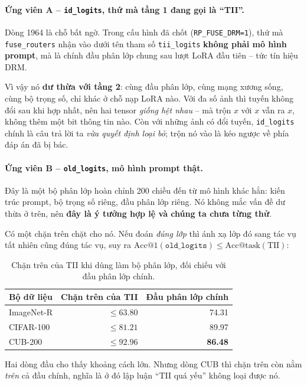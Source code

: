 \documentclass[11pt,a4paper]{article}
\begin{document}
\paragraph{Ứng viên A -- \texttt{id\_logits}, thứ mà tầng 1 đang gọi là ``TII''.}
Dòng 1964 là chỗ bất ngờ. Trong cấu hình đã chốt (\texttt{RP\_FUSE\_DRM=1}), thứ
mà \texttt{fuse\_routers} nhận vào dưới tên tham số \texttt{tii\_logits}
\textbf{không phải mô hình prompt}, mà là chính đầu phân lớp chung sau lượt LoRA
đầu tiên -- tức tín hiệu DRM.

Vì vậy nó \textbf{dư thừa với tầng 2}: cùng đầu phân lớp, cùng mạng xương sống,
cùng bộ trọng số, chỉ khác ở chỗ nạp LoRA nào. Với đa số ảnh thì tuyến không đổi
sau khi hợp nhất, nên hai tensor \emph{giống hệt nhau} -- mà trộn $x$ với $x$ vẫn
ra $x$, không thêm một bit thông tin nào. Còn với những ảnh có đổi tuyến,
\texttt{id\_logits} chính là câu trả lời ta \emph{vừa quyết định loại bỏ}; trộn
nó vào là kéo ngược về phía đáp án đã bị bác.

\paragraph{Ứng viên B -- \texttt{old\_logits}, mô hình prompt thật.}
Đây là một bộ phân lớp hoàn chỉnh 200 chiều đến từ mô hình khác hẳn: kiến trúc
prompt, bộ trọng số riêng, đầu phân lớp riêng. Nó không mắc vấn đề dư thừa ở
trên, nên \textbf{đây là ý tưởng hợp lệ và chúng ta chưa từng thử}.

Có một chặn trên chặt cho nó. Nếu đoán \emph{đúng lớp} thì ánh xạ lớp đó sang tác
vụ tất nhiên cũng đúng tác vụ, suy ra
$\mathrm{Acc@1}(\texttt{old\_logits}) \le \mathrm{Acc@task}(\text{TII})$:

\begin{table}[htbp]
\centering
\caption{Chặn trên của TII khi dùng làm bộ phân lớp, đối chiếu với đầu phân lớp
chính.}
\label{tab:tii-chan-tren}
\begin{tabular}{lrr}
\toprule
Bộ dữ liệu & Chặn trên của TII & Đầu phân lớp chính \\
\midrule
ImageNet-R & $\le 63.80$ & 74.31 \\
CIFAR-100  & $\le 81.21$ & 89.97 \\
CUB-200    & $\le 92.96$ & \textbf{86.48} \\
\bottomrule
\end{tabular}
\end{table}

Hai dòng đầu cho thấy khoảng cách lớn. Nhưng dòng CUB thì chặn trên còn nằm
\emph{trên} cả đầu chính, nghĩa là ở đó lập luận ``TII quá yếu'' không loại được
nó.
\end{document}

